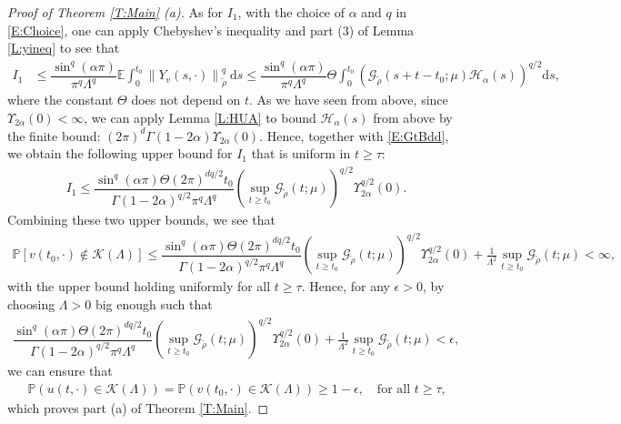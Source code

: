\documentclass[12pt]{report}
\theoremstyle{plain}
\theoremstyle{definition}
\numberwithin{equation}{section}
\newcommand{\E}{\mathbb{E}}
\newcommand{\Norm}[1]{\left\|  #1   \right\|}
\newcommand{\ud}{\ensuremath{ \mathrm{d} }}
\begin{document}
\begin{proof}[Proof of Theorem \ref{T:Main} (a)]
	As for $I_1$, with the choice of $\alpha$ and $q$ in \eqref{E:Choice}, one can apply Chebyshev's
	inequality and part (3) of Lemma \ref{L:yineq} to see that
	\begin{align*}
	I_1 & \le \dfrac{\sin^q(\alpha \pi)}{\pi^q \Lambda^q}\E \int_{0}^{t_0} \Norm{Y_v(s,\cdot)}_{\tilde{\rho}}^q \: \ud s
	\le \dfrac{\sin^q(\alpha \pi)}{\pi^q \Lambda^q} \Theta\int_0^{t_0}
	\left(\mathcal{G}_{\tilde{\rho}}(s + t-t_0;\mu) \mathcal{H}_{\alpha}(s)\right)^{q/2} \ud s,
	\end{align*}
	where the constant $\Theta$ does not depend on $t$. As we have seen from above, since
	$\Upsilon_{2\alpha}(0)<\infty$, we can apply Lemma \ref{L:HUA} to bound $\mathcal{H}_{\alpha}(s)$
	from above by the finite bound: $\left(2\pi\right)^d \Gamma(1-2\alpha) \Upsilon_{2\alpha}(0)$.
	Hence, together with \eqref{E:GtBdd}, we obtain the following upper bound for $I_1$ that is
	uniform in $t\ge \tau$:
	\begin{align*}
	I_1 \le  \dfrac{\sin^q(\alpha \pi)\Theta (2\pi)^{dq/2} t_0 }{\Gamma\left(1-2\alpha\right)^{q/2}\pi^q \Lambda^q} \left( \sup_{t\ge t_0} \mathcal{G}_{\tilde{\rho}}\left(t;\mu\right)\right)^{q/2} \Upsilon_{2\alpha}^{q/2}(0).
	\end{align*}
	Combining these two upper bounds, we see that
	\begin{align*}
	\mathbb{P} \left[ v(t_0,\cdot) \not \in \mathscr{K}(\Lambda) \right ]
	\le
	\dfrac{\sin^q(\alpha \pi)\Theta (2\pi)^{dq/2} t_0 }{\Gamma\left(1-2\alpha\right)^{q/2}\pi^q \Lambda^q} \left( \sup_{t\ge t_0} \mathcal{G}_{\tilde{\rho}}\left(t;\mu\right)\right)^{q/2} \Upsilon_{2\alpha}^{q/2}(0)
	+
	\frac{1}{\Lambda^2}   \sup_{t\ge t_0} \mathcal{G}_{\tilde{\rho}}\left(t;\mu\right)
	<\infty,
	\end{align*}
	with the upper bound holding uniformly for all $t\ge \tau$. Hence, for any $\epsilon>0$, by
	choosing $\Lambda > 0$ big enough such that
	\begin{align*}
	\dfrac{\sin^q(\alpha \pi)\Theta (2\pi)^{dq/2} t_0 }{\Gamma\left(1-2\alpha\right)^{q/2}\pi^q \Lambda^q} \left( \sup_{t\ge t_0} \mathcal{G}_{\tilde{\rho}}\left(t;\mu\right)\right)^{q/2} \Upsilon_{2\alpha}^{q/2}(0)
	+
	\frac{1}{\Lambda^2}   \sup_{t\ge t_0} \mathcal{G}_{\tilde{\rho}}\left(t;\mu\right)
	< \epsilon,
	\end{align*}
	we can ensure that
	\begin{align*}
	\mathbb{P}\left(u(t,\cdot) \in \mathscr{K}(\Lambda) \right)
	= \mathbb{P}\left(v(t_0,\cdot) \in \mathscr{K}(\Lambda) \right)
	\ge 1- \epsilon, \quad  \text{for all $t\ge \tau$,}
	\end{align*}
	which proves part (a) of Theorem \ref{T:Main}.
\end{proof}
\end{document}

